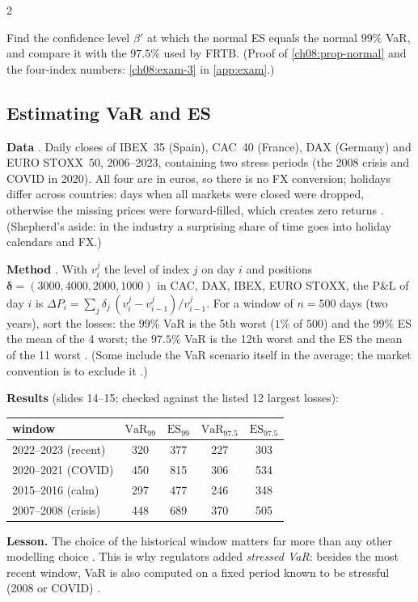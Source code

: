 \begin{paracol}{2}
\begin{exercise}\label{ch08:exam-3-short}
Find the confidence level $\beta'$ at which the normal ES equals the normal $99\%$ VaR, and compare it with the $97.5\%$ used by FRTB. (Proof of \cref{ch08:prop-normal} and the four-index numbers: \cref{ch08:exam-3} in \cref{app:exam}.)
\end{exercise}

\subsection{Estimating VaR and ES}\label{ch08:sec-estimation}

\begin{casestudy}
\textbf{Data} . Daily closes of IBEX~35 (Spain), CAC~40 (France), DAX (Germany) and EURO STOXX~50,
2006--2023, containing two stress periods (the 2008 crisis and COVID in 2020). All four are in euros, so there is no FX
conversion; holidays differ across countries: days when all markets were closed were dropped, otherwise the
missing prices were forward-filled, which creates zero returns . (Shepherd's aside: in the
industry a surprising share of time goes into holiday calendars and FX.)

\textbf{Method} . With $v_i^j$ the level of index $j$ on day $i$ and positions
$\bm\delta=(3000,4000,2000,1000)$ in CAC, DAX, IBEX, EURO STOXX, the P\&L of day $i$ is
$\Delta P_i=\sum_j\delta_j\,(v_i^j-v_{i-1}^j)/v_{i-1}^j$. For a window of $n=500$ days (two years), sort the
losses: the $99\%$ VaR is the 5th worst ($1\%$ of $500$) and the $99\%$ ES the mean of the 4 worst; the $97.5\%$ VaR
is the 12th worst and the ES the mean of the 11 worst . (Some include the VaR scenario itself in
the average; the market convention is to exclude it .)

\textbf{Results} (slides 14--15; checked against the listed 12 largest losses):
\begin{center}\small
\begin{tabular}{@{}lcccc@{}}
\toprule
window & $\mathrm{VaR}_{99}$ & $\mathrm{ES}_{99}$ & $\mathrm{VaR}_{97.5}$ & $\mathrm{ES}_{97.5}$\\
\midrule
2022--2023 (recent)   & 320 & 377 & 227 & 303\\
2020--2021 (COVID)    & 450 & 815 & 306 & 534\\
2015--2016 (calm)     & 297 & 477 & 246 & 348\\
2007--2008 (crisis)   & 448 & 689 & 370 & 505\\
\bottomrule
\end{tabular}
\end{center}
\textbf{Lesson.} The choice of the historical window matters far more than any other modelling choice
. This is why regulators added \emph{stressed VaR}: besides the most recent window, VaR is also
computed on a fixed period known to be stressful (2008 or COVID) .
\end{casestudy}


\end{paracol}
